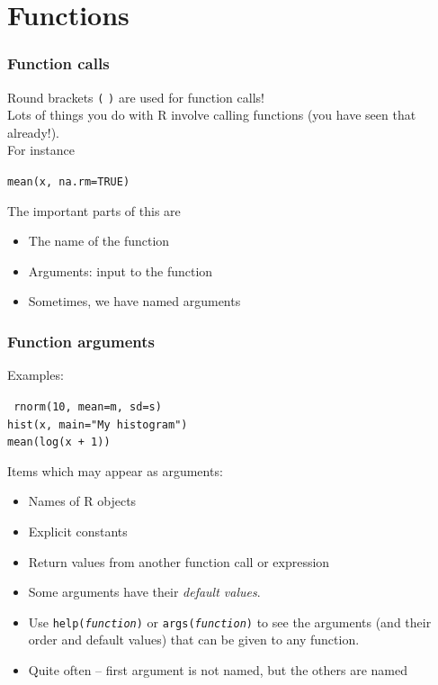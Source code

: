 \documentclass{beamer}
\newcommand{\code}[1]{\texttt{#1}}
\begin{document}
\section{Functions}
\begin{frame} 
  \frametitle{Function calls}
 \alert{{\large Round brackets \code{(} \code{)} are used for function calls!}}\\[0.2cm]
  Lots of things you do with R involve calling functions (you have seen that already!).\\
  For instance
  \begin{center}
    \large
    \texttt{\alert<2>{mean}(\alert<3>{x}, \alert<4>{na.rm=\alert<3>{TRUE}})}
  \end{center}
  The important parts of this are
  \pause
\begin{itemize}
\item The \alert<2>{name} of the function
\item \alert<3>{Arguments}: input to the function
 \item Sometimes, we have \alert<4>{named arguments}
\end{itemize}
\end{frame}

\begin{frame}
  \frametitle{Function arguments}
Examples:
  \begin{center}
    \large
\texttt{
rnorm(\alert<3>{10}, \alert<6>{mean=}\alert<2>{m}, 
    \alert<6>{sd=}\alert<2>{s})\\
hist(\alert<2>{x}, \alert<6>{main=}\alert<3>{"My histogram"})\\
mean(\alert<4>{log(x + 1)})}
  \end{center}
Items which may appear as arguments:
  \begin{itemize}
  \item \alert<2>{Names} of R objects
  \item Explicit \alert<3>{constants}
  \item \alert<4>{Return values} from another function call or expression
  \item Some arguments have their \emph{default values}. 
\item 
Use \code{help(\textit{function})} or  \code{args(\textit{function})} to see the arguments (and their order and default values) that can be given to any function. 
\item Quite often -- first argument is not named, but the others are named
  \end{itemize}
\end{frame}
\end{document}
